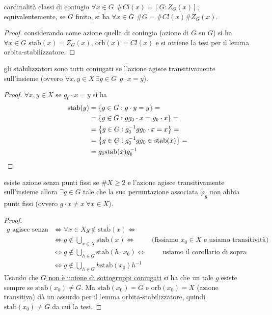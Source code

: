 \begin{example2}{cardinalità classi di coniugio}
    $\forall x \in G \ \ \#Cl(x) = [G : Z_G(x)]$; equivalentemente, se $G$ finito, si ha $\forall x \in G$ $\#G = \#Cl(x) \#Z_G(x)$.
\end{example2}
\begin{proof}
    considerando come azione quella di coniugio (azione di $G$ su $G$) si ha $\forall x \in G$ $\text{stab}(x) = Z_G(x)$, $\text{orb}(x) = Cl(x)$ e si ottiene la tesi per il lemma orbita-stabilizzatore.   
\end{proof}
\begin{corollary}{gli stabilizzatori sono tutti coniugati}
    se l'azione agisce transitivamente sull'insieme (ovvero $\forall x,y \in X \ \exists g \in G \ \ g \cdot x = y$).
\end{corollary}
\begin{proof} $\forall x,y \in X $ se $g_0 \cdot x = y$ si ha 
    \begin{align*}
        \text{stab}(y) & = \left\{ g \in G : g \cdot y = y \right\} = \\
         & = \left\{ g \in G : gg_0 \cdot x = g_0 \cdot x \right\} = \\
         & = \left\{ g \in G : g_0^{-1}gg_0 \cdot x = x \right\} = \\
         & = \left\{ g \in G : g_0^{-1}gg_0 \in \text{stab}(x) \right\} = \\
         & = g_0\text{stab}(x)g_0^{-1}
    \end{align*} 
\end{proof}
\begin{example2}{esiste azione senza punti fissi}
    se $\#X \geq 2$ e l'azione agisce transitivamente sull'insieme allora $\exists g \in G$ tale che la sua permutazione associata $\varphi_g$ non abbia punti fissi (ovvero $g\cdot x \neq x \ \forall x \in X$).
\end{example2}
\begin{proof}
    \begin{align*}
        g \text{ agisce senza punti fissi } & \iff \forall x \in X g \not \in \text{stab}(x) \iff \\
        & \iff g \not \in \bigcup_{x \in X} \text{stab}(x) \iff  \qquad \text{ (fissiamo $x_0 \in X$ e usiamo transitività)} \\
        & \iff g \not \in \bigcup_{h \in G} \text{stab}(h \cdot x_0) \iff \qquad \text{ usiamo il corollario di sopra} \\
        & \iff g \not \in \bigcup_{h \in G} h\text{stab}(x_0) h^{-1} 
    \end{align*}
    Usando che \hyperlink{es1}{$G$ non è unione di sottogruppi coniugati} si ha che un tale $g$ esiste sempre se $\text{stab}(x_0) \neq G$. Ma $\text{stab}(x_0) = G$ e $\text{orb}(x_0) = X$ (azione transitiva) dà un assurdo per il lemma orbita-stabilizzatore, quindi $\text{stab}(x_0) \neq G$ da cui la tesi. 
\end{proof}
